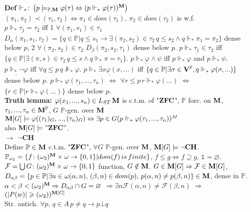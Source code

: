 \documentclass[9pt]{article}
\newcommand{\class}[1]{{\bf #1}}
\newcommand{\Pp}{\mathbb{P}}
\newcommand{\mytitle}[1]{ {\bf $\rightarrow$ #1}\\}
\newcommand{\V}{\class{V}}
\newcommand{\M}{\class{M}}
\begin{document}
\begin{multicols*}{2}
{\bf Def} $\Vdash_*\colon \left(p\models_{\Pp,\class{M}}\varphi(\tau)\Leftrightarrow (p\Vdash_*\varphi(\tau))^\class{M}\right)$\\
$(\pi_1,\pi_2)\prec (\tau_1,\tau_2)\Leftrightarrow \pi_1\in dom(\tau_1),\,\pi_2\in dom(\tau_2)$ is w.f.\\
$\underline{p\Vdash_*\tau_1=\tau_2}$ iff
1 $\forall (\pi_1,s_1)\in\tau_1$ $D_\alpha(\pi_1,s_1,\tau_2)=\{q\in\Pp|q\leqslant s_1\to \exists(\pi_2,s_2)\in\tau_2\,q\leqslant s_2\wedge q\Vdash_*\pi_1=\pi_2\}$ dense below $p$, 2 $\forall(\pi_2,s_2)\in\tau_2$ $D_\beta(\pi_2,s_2,\tau_1)$ dense below $p$.
$\underline{p\Vdash_*\tau_1\in\tau_2}$ iff $\{q\in \Pp|\exists (\pi,s)\in\tau_2\,q\leqslant s\wedge q\Vdash_* \pi=\tau_1\}$.
$\underline{p\Vdash_*\varphi\wedge\psi}$ iff $p\Vdash_*\varphi$ and $p\Vdash_*\psi$.
$\underline{p\Vdash_*\neg\varphi}$ iff $\forall q\leqslant p\,q\not\Vdash_*\varphi$.
$\underline{p\Vdash_*\exists x\varphi(x,...)}$ iff $\{q\in \Pp|\exists \sigma\in\V^\Pp,q\Vdash_*\varphi(\sigma,...)\}$ dense below $p$.
$\underline{p\Vdash_*\varphi(\tau_1,...,\tau_n)}$ $\Leftrightarrow$ $\forall r\leqslant p\,r\Vdash_*\varphi(...)$ $\Leftrightarrow$ $\{r\in\Pp|r\Vdash_*\varphi(...)\}$ dense below $p$.\\
{\bf Truth lemma:} $\varphi(x_1,...,s_n)\in L_{ST}\,\class{M}$ is c.t.m. of "$\class{ZFC}$", $\Pp$ forc. on $\class{M}$, $\tau_1,...,\tau_n\in\class{M}^\Pp$, $G$ $\Pp$-gen. over $\class{M}$ $\class{M}[G]\models \varphi((\tau_1)_G,...,(\tau_n)_G)\Leftrightarrow\exists p\in G(p\Vdash_*\varphi(\tau_1,...,\tau_n))^M$\\
also $\class{M}[G]\models "\class{ZFC}"$.\\
\mytitle{$\neg$CH}
Define $\Pp\in\class{M}$ c.t.m. "$\class{ZFC}$", $\forall G$ $\Pp$-gen. over $\class{M}$, $\class{M}[G]\models\neg\class{CH}$.
$\Pp_{\omega_2}=\{f\colon (\omega_2)^\class{M}\times\omega\to\{0,1\}|dom(f)\,is\,finite\}$, $f\leqslant g\Leftrightarrow f\supseteq g$, $\mathbb{1}=\varnothing$.
$\mathcal{F}=\bigcup G\colon (\omega_2)^\class{M}\times\omega\to\{0,1\}$ function, $G\notin\class{M}$. $G\in \M[G]\Rightarrow\mathcal{F}\in\class{M}[G]$,\\
$D_{\alpha\beta}=\{p\in\Pp|\exists n\in\omega (\alpha,n),\,(\beta,n)\in dom(p),\,p(\alpha,n)\neq p(\beta, n)\}\in \M$, dense in $\Pp$. $\alpha<\beta<(\omega_2)^\M\Rightarrow D_{\alpha\beta}\cap G=\varnothing$ $\Rightarrow\exists n \mathcal{F}(\alpha, n)\neq\mathcal{F}(\beta, n)$ $\Rightarrow$ $(|P(w)|\geqslant (\omega_2))^{\M[G]}$\\
Str. antich. $\forall p,\,q\in A\,p\neq q\to p\bot q$\\

\end{multicols*}
\end{document}
